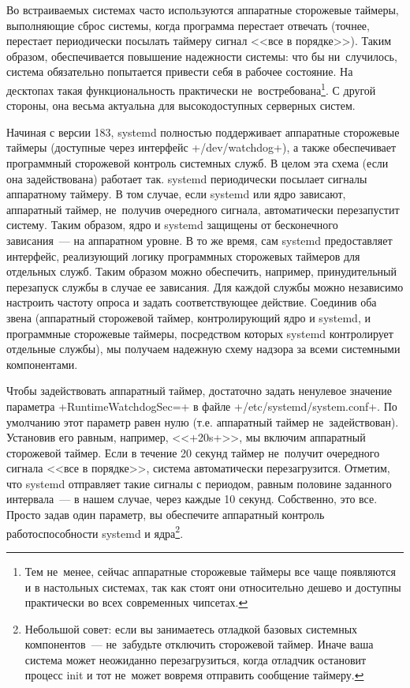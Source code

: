 \documentclass[10pt,oneside,a4paper]{article}
\begin{document}
Во встраиваемых системах часто используются аппаратные сторожевые таймеры,
выполняющие сброс системы, когда программа перестает отвечать (точнее, перестает
периодически посылать таймеру сигнал <<все в порядке>>). Таким образом,
обеспечивается повышение надежности системы: что бы ни~случилось, система
обязательно попытается привести себя в рабочее состояние. На десктопах такая
функциональность практически не~востребована\footnote{Тем не~менее, сейчас
аппаратные сторожевые таймеры все чаще появляются и в настольных системах, так
как стоят они относительно дешево и доступны практически во всех современных
чипсетах.}. С другой стороны, она весьма актуальна для высокодоступных серверных
систем.

Начиная с версии 183, systemd полностью поддерживает аппаратные сторожевые
таймеры (доступные через интерфейс +/dev/watchdog+), а также обеспечивает
программный сторожевой контроль системных служб. В целом эта схема (если она
задействована) работает так. systemd периодически посылает сигналы аппаратному
таймеру. В том случае, если systemd или ядро зависают, аппаратный таймер,
не~получив очередного сигнала, автоматически перезапустит систему. Таким
образом, ядро и systemd защищены от бесконечного зависания~--- на аппаратном
уровне. В то же время, сам systemd предоставляет интерфейс, реализующий логику
программных сторожевых таймеров для отдельных служб. Таким образом можно
обеспечить, например, принудительный перезапуск службы в случае ее зависания.
Для каждой службы можно независимо настроить частоту опроса и задать
соответствующее действие. Соединив оба звена (аппаратный сторожевой таймер,
контролирующий ядро и systemd, и программные сторожевые таймеры, посредством
которых systemd контролирует отдельные службы), мы получаем надежную схему
надзора за всеми системными компонентами.

Чтобы задействовать аппаратный таймер, достаточно задать ненулевое значение
параметра +RuntimeWatchdogSec=+ в файле +/etc/systemd/system.conf+. По умолчанию
этот параметр равен нулю (т.е. аппаратный таймер не~задействован). Установив его
равным, например, <<+20s+>>, мы включим аппаратный сторожевой таймер. Если в
течение 20 секунд таймер не~получит очередного сигнала <<все в порядке>>,
система автоматически перезагрузится. Отметим, что systemd отправляет такие
сигналы с периодом, равным половине заданного интервала~--- в нашем случае,
через каждые 10 секунд. Собственно, это все. Просто задав один параметр,
вы обеспечите аппаратный контроль работоспособности systemd и
ядра\footnote{Небольшой совет: если вы занимаетесь отладкой базовых системных
компонентов~--- не~забудьте отключить сторожевой таймер. Иначе ваша система
может неожиданно перезагрузиться, когда отладчик остановит процесс init и тот
не~может вовремя отправить сообщение таймеру.}.
\end{document}
